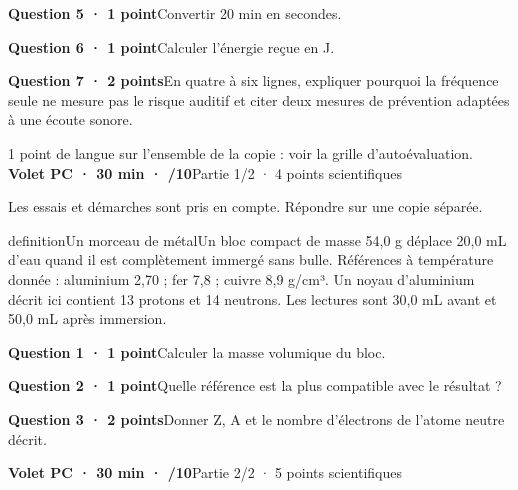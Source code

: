 \par\addvspace{3mm}\noindent\textbf{Question 5 · 1 point}\quad Convertir 20 min en secondes.\par
\par\addvspace{3mm}\noindent\textbf{Question 6 · 1 point}\quad Calculer l’énergie reçue en J.\par
\par\addvspace{3mm}\noindent\textbf{Question 7 · 2 points}\quad En quatre à six lignes, expliquer pourquoi la fréquence seule ne mesure pas le risque auditif et citer deux mesures de prévention adaptées à une écoute sonore.\par
\vfill{}
{\small 1 point de langue sur l’ensemble de la copie : voir la grille d’autoévaluation.}
\label{bb-7}
\noindent\textbf{Volet PC · 30 min · /10}\hfill Partie 1/2 · 4 points scientifiques
\par\vspace{2mm}Les essais et démarches sont pris en compte. Répondre sur une copie séparée.\par
\begin{pcEncadre}{definition}{Un morceau de métal}Un bloc compact de masse 54,0 g déplace 20,0 mL d’eau quand il est complètement immergé sans bulle. Références à température donnée : aluminium 2,70 ; fer 7,8 ; cuivre 8,9 g/cm³. Un noyau d’aluminium décrit ici contient 13 protons et 14 neutrons. Les lectures sont 30,0 mL avant et 50,0 mL après immersion.\end{pcEncadre}
\par\addvspace{3mm}\noindent\textbf{Question 1 · 1 point}\quad Calculer la masse volumique du bloc.\par
\par\addvspace{3mm}\noindent\textbf{Question 2 · 1 point}\quad Quelle référence est la plus compatible avec le résultat ?\par
\par\addvspace{3mm}\noindent\textbf{Question 3 · 2 points}\quad Donner Z, A et le nombre d’électrons de l’atome neutre décrit.\par
\vfill{}
\noindent\textbf{Volet PC · 30 min · /10}\hfill Partie 2/2 · 5 points scientifiques
